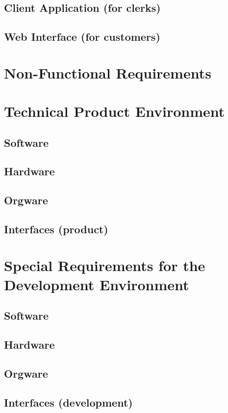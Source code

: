 \documentclass[11pt,a4paper,oneside,svgnames,draft]{report}
\begin{document}
\section{Client Application (for clerks)}
\section{Web Interface (for customers)}

\chapter{Non-Functional Requirements}
\chapter{Technical Product Environment}
\section{Software}
\section{Hardware}
\section{Orgware}
\section{Interfaces (product)}

\chapter{Special Requirements for the Development Environment}
\section{Software}
\section{Hardware}
\section{Orgware}
\section{Interfaces (development)}
\end{document}
